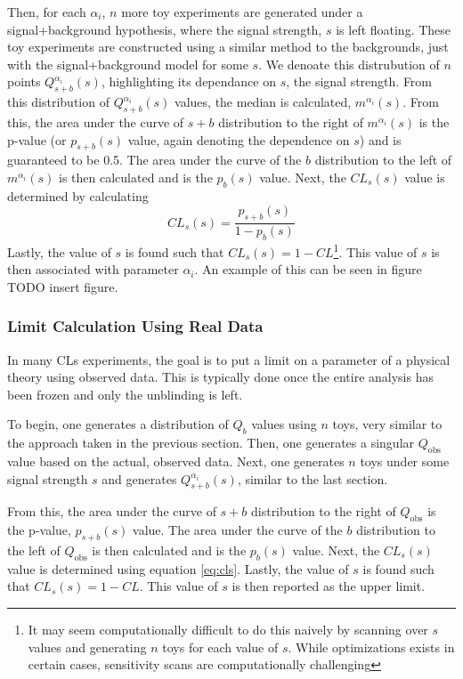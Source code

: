 Then, for each $\alpha_i$, $n$ more toy experiments are generated under a signal+background hypothesis, where the signal strength, $s$ is left floating. These toy experiments are constructed using a similar method to the backgrounds, just with the signal+background model for some $s$. We denoate this distrubution of $n$ points $Q^{\alpha_i}_{s+b}(s)$, highlighting its dependance on $s$, the signal strength. From this distribution of $Q^{\alpha_i}_{s+b}(s)$ values, the median is calculated, $m^{\alpha_i}(s)$. From this, the area under the curve of $s+b$ distribution to the right of $m^{\alpha_i}(s)$ is the p-value (or $p_{s+b}(s)$ value, again denoting the dependence on $s$) and is guaranteed to be 0.5. The area under the curve of the $b$ distribution to the left of $m^{\alpha_i}(s)$ is then calculated and is the $p_b(s)$ value. Next, the $CL_s(s)$ value is determined by calculating
\begin{equation}
    CL_s(s) = \frac{p_{s+b}(s)}{1-p_b(s)}
\label{eq:cls}
\end{equation}
Lastly, the value of $s$ is found such that $CL_s(s) = 1-CL$\footnote{It may seem computationally difficult to do this naively by scanning over $s$ values and generating $n$ toys for each value of $s$. While optimizations exists in certain cases, sensitivity scans are computationally challenging}. This value of $s$ is then associated with parameter $\alpha_i$. An example of this can be seen in figure TODO insert figure.


\subsubsection{Limit Calculation Using Real Data}
\label{subsubsec:limit_calculation_theory}

In many CLs experiments, the goal is to put a limit on a parameter of a physical theory using observed data. This is typically done once the entire analysis has been frozen and only the unblinding is left.

To begin, one generates a distribution of $Q_b$ values using $n$ toys, very similar to the approach taken in the previous section. Then, one generates a singular $Q_{\text{obs}}$ value based on the actual, observed data. Next, one generates $n$ toys under some signal strength $s$ and generates $Q^{\alpha_i}_{s+b}(s)$, similar to the last section. 

From this, the area under the curve of $s+b$ distribution to the right of $Q_{\text{obs}}$ is the p-value, $p_{s+b}(s)$ value. The area under the curve of the $b$ distribution to the left of $Q_{\text{obs}}$ is then calculated and is the $p_b(s)$ value. Next, the $CL_s(s)$ value is determined using equation \ref{eq:cls}. Lastly, the value of $s$ is found such that $CL_s(s) = 1-CL$. This value of $s$ is then reported as the upper limit. 

